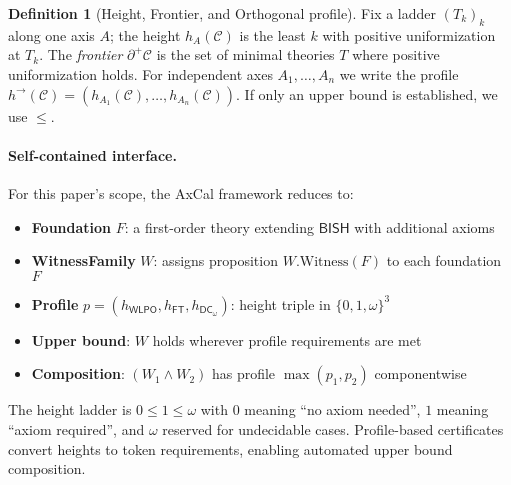\documentclass[11pt]{article}
\newcommand{\WLPO}{\mathsf{WLPO}}
\newcommand{\FT}{\mathsf{FT}}
\newcommand{\DCw}{\mathsf{DC}_{\omega}}
\theoremstyle{plain}
\theoremstyle{definition}
\newtheorem{definition}[theorem]{Definition}
\theoremstyle{remark}
\newcommand{\BISH}{\mathsf{BISH}}
\newcommand{\Frontierpos}{\partial^{+}}
\begin{document}
\begin{definition}[Height, Frontier, and Orthogonal profile]
Fix a ladder $(T_k)_k$ along one axis $A$; the height $h_A(\mathcal{C})$ is the least $k$ with positive uniformization at $T_k$.
The \emph{frontier} $\Frontierpos\mathcal{C}$ is the set of minimal theories $T$ where positive uniformization holds.
For independent axes $A_1,\dots,A_n$ we write the profile
$h^{\to}(\mathcal{C})=(h_{A_1}(\mathcal{C}),\ldots,h_{A_n}(\mathcal{C}))$. If only an upper bound is established, we use $\le$.
\end{definition}

\paragraph{Self-contained interface.}
For this paper's scope, the AxCal framework reduces to:
\begin{itemize}
\item \textbf{Foundation} $F$: a first-order theory extending $\BISH$ with additional axioms
\item \textbf{WitnessFamily} $W$: assigns proposition $W.\mathrm{Witness}(F)$ to each foundation $F$
\item \textbf{Profile} $p = (h_{\WLPO}, h_{\FT}, h_{\DCw})$: height triple in $\{0,1,\omega\}^3$
\item \textbf{Upper bound}: $W$ holds wherever profile requirements are met
\item \textbf{Composition}: $(W_1 \land W_2)$ has profile $\max(p_1, p_2)$ componentwise
\end{itemize}
The height ladder is $0 \leq 1 \leq \omega$ with $0$ meaning ``no axiom needed'', $1$ meaning ``axiom required'', and $\omega$ reserved for undecidable cases. Profile-based certificates convert heights to token requirements, enabling automated upper bound composition.
\end{document}
